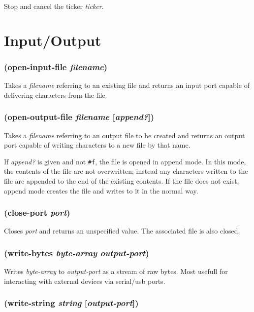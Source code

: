 \documentclass{article}
\begin{document}
Stop and cancel the ticker \emph{ticker}.

\section{Input/Output}\label{sec:inputoutput}

\subsubsection{(open-input-file \emph{filename})}

Takes a \emph{filename} referring to an existing file and returns an input port capable of
delivering characters from the file.

\subsubsection{(open-output-file \emph{filename} [\emph{append?}])}

Takes a \emph{filename} referring to an output file to be created and returns an output port
capable of writing characters to a new file by that name.

If \emph{append?} is given and not \verb|#f|, the file is opened in append mode. In this
mode, the contents of the file are not overwritten; instead any characters written to the file
are appended to the end of the existing contents. If the file does not exist, append mode
creates the file and writes to it in the normal way.

\subsubsection{(close-port \emph{port})}

Closes \emph{port} and returns an unspecified value. The associated file is also closed.

\subsubsection{(write-bytes \emph{byte-array} \emph{output-port})}

Writes \emph{byte-array} to \emph{output-port} as a stream of raw bytes. Most usefull for
interacting with external devices via serial/usb ports.

\subsubsection{(write-string \emph{string} [\emph{output-port}])}
\end{document}
